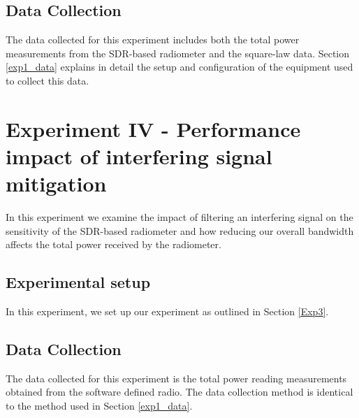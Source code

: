 \subsection{Data Collection}

The data collected for this experiment includes both the total power measurements from the SDR-based radiometer and the square-law data.  Section \ref{exp1_data} explains in detail the setup and configuration of the equipment used to collect this data.

\section{Experiment IV - Performance impact of interfering signal mitigation}\label{Exp4}

In this experiment we examine the impact of filtering an interfering signal on the sensitivity of the SDR-based radiometer and how reducing our overall bandwidth affects the total power received by the radiometer.

\subsection{Experimental setup} \label{exp4_setup}

In this experiment, we set up our experiment as outlined in Section \ref{Exp3}.

\subsection{Data Collection}

The data collected for this experiment is the total power reading measurements obtained from the software defined radio.  The data collection method is identical to the method used in Section \ref{exp1_data}.

